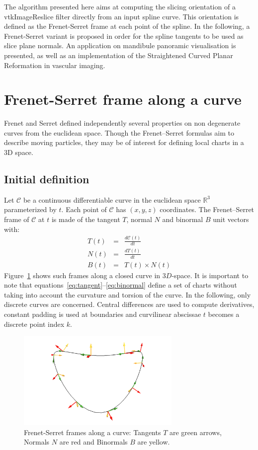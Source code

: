 \documentclass{InsightArticle}
\begin{document}
The algorithm presented here aims at computing the slicing orientation of a
vtkImageReslice filter directly from an input spline curve. This orientation
is defined as the Frenet-Serret frame at each point of the spline. In the 
following, a Frenet-Serret variant is proposed in order for the spline tangents
to be used as slice plane normals. An application on mandibule panoramic 
visualisation is presented, as well as an implementation of the Straightened
Curved Planar Reformation in vascular imaging.
%
\section{Frenet-Serret frame along a curve}
Frenet \cite{FRE52} and Serret \cite{SER51} defined independently several
properties on non degenerate curves from the euclidean space. Though the 
Frenet--Serret formulas aim to describe moving particles, they may be of
interest for defining local charts in a 3D space. 
%
\subsection{Initial definition}
%
Let $\mathcal{C}$ be a continuous differentiable curve in the euclidean space
$\mathbb{R}^3$ parameterized by $t$. Each point of $\mathcal{C}$ has $(x,y,z)$
coordinates. The Frenet--Serret frame of $\mathcal{C}$ at $t$ is made of the 
tangent $T$, normal $N$ and binormal $B$ unit vectors with:
\begin{eqnarray}
T(t) &=& \frac{d\mathcal{C}(t)}{dt}\label{eq:tangent}\\
N(t) &=& \frac{dT(t)}{dt}\label{eq:normal}\\
B(t) &=& T(t)\times N(t)\label{eq:binormal}
\end{eqnarray}
%
Figure~\ref{fig:frenet-serret_frames} shows such frames along a closed curve
in $3D$-space. It is important to note that
equations~\eqref{eq:tangent}--\eqref{eq:binormal}
define a set of charts without taking into account the curvature and torsion of
the curve. In the following, only discrete curves are concerned. Central
differences are used to compute derivatives, constant padding is used at
boundaries and curvilinear abscissae $t$ becomes a discrete point index $k$.
%
\begin{figure}
\centering
\includegraphics[width=0.7\textwidth]{Images/frenet-serret_frames}
\caption{Frenet-Serret frames along a curve: Tangents $T$ are green arrows,
Normals $N$ are red and Binormals $B$ are yellow.}
\label{fig:frenet-serret_frames}
\end{figure}
%
\end{document}
